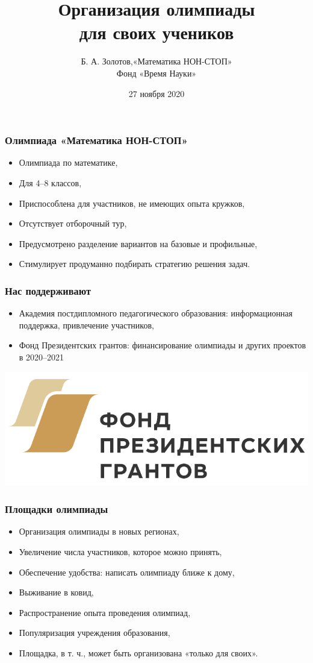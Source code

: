 \documentclass[aspectratio=1610,12pt,notheorems]{beamer}
\title[Methodic keys to MNS]
    {\bfseries Организация олимпиады \\
	для своих учеников}
\author[\ ]
	{Б. А. Золотов,\quad «Математика НОН-СТОП»\\ \vspace{0.3cm}
		{\small Фонд «Время Науки»}}
\institute[\ ]{\ }
\date{27 ноября 2020}
\begin{document}
\frame{\titlepage}

\begin{frame} \frametitle{Олимпиада «Математика НОН-СТОП»}
\begin{itemize}
	\item Олимпиада по математике, \medskip
	\item Для 4–8 классов, \medskip
	\item Приспособлена для участников, не имеющих опыта кружков, \medskip
	\item Отсутствует отборочный тур, \medskip
	\item Предусмотрено разделение вариантов на базовые и профильные, \medskip
	\item Стимулирует продуманно подбирать стратегию решения задач. \medskip
\end{itemize}
\end{frame}

\begin{frame} \frametitle{Нас поддерживают}
\begin{itemize}
	\item Академия постдипломного педагогического образования: информационная поддержка, привлечение участников, \medskip
	\item Фонд Президентских грантов: финансирование олимпиады и других проектов в 2020–2021
\end{itemize}

	\vspace{0.45cm}
	\begin{center}
		\includegraphics[scale=0.5]{fpg/fpg}
	\end{center}
\end{frame}





\begin{frame} \frametitle{Площадки олимпиады}
\begin{itemize}
	\item Организация олимпиады в новых регионах, \medskip
	\item Увеличение числа участников, которое можно принять, \medskip
	\item Обеспечение удобства: написать олимпиаду ближе к дому, \medskip
	\item Выживание в ковид, \medskip
	\item Распространение опыта проведения олимпиад, \medskip
	\item Популяризация учреждения образования, \medskip
	\item Площадка, в т. ч., может быть организована «только для своих».
\end{itemize}
\end{frame}
\end{document}

